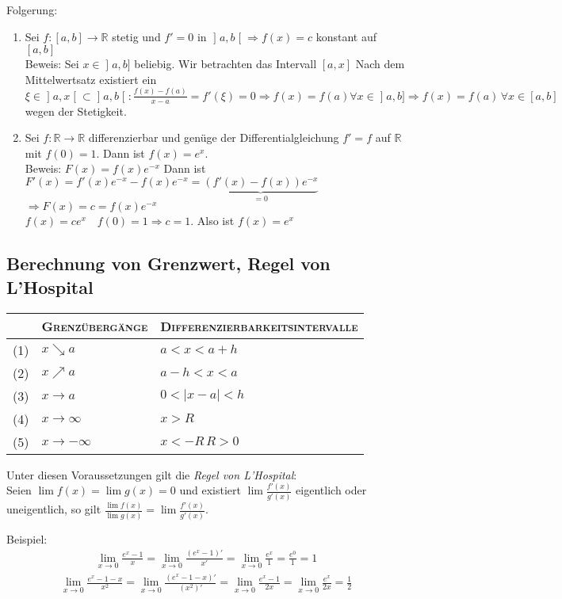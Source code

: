 \documentclass[ngerman,titlepage,twoside, parskip=half*]{scrreprt}
\newcommand*{\R}{\mathbb{R}}
\theoremstyle{plain}
\theoremstyle{definition}
\theoremstyle{remark}
\newcommand*{\abs}[2][]{#1\lvert#2#1\rvert}
\newcommand*{\lsofint}[1]{\mathopen{]}#1]}   %
\newcommand*{\bsofint}[1]{\mathopen{]}#1\mathclose{[}} %
\begin{document}
Folgerung:
\begin{enumerate}[(1)]
  \item Sei $f\colon[a,b]\rightarrow\R$ stetig und $f'=0$ in $\bsofint{a,b}
    \Rightarrow f(x)=c$ konstant auf $[a,b]$\\
    Beweis: Sei $x\in\lsofint{a,b}$ beliebig. Wir betrachten das Intervall $[a,x]$
    Nach dem Mittelwertsatz existiert ein $\xi\in\bsofint{a,x}\subset\bsofint{a,b}\colon
    \frac{f(x)-f(a)}{x-a}=f'(\xi)=0\Rightarrow f(x)=f(a) \forall x\in
    \lsofint{a,b}\Rightarrow f(x)=f(a)\,\forall x\in[a,b]$ wegen der Stetigkeit.
  \item Sei $f\colon\R\rightarrow\R$ differenzierbar und genüge der
    Differentialgleichung $f'=f$ auf $\R$ mit $f(0)=1$. Dann ist
    $f(x)=e^x$.\\
    Beweis: $F(x)=f(x)e^{-x}$ Dann ist $F'(x)=f'(x)e^{-x}-f(x)e^{-x}=
    \underbrace{(f'(x)-f(x))e^{-x}}_{=0}$\\
    $\Rightarrow F(x)=c=f(x)e^{-x}$\\
    $f(x)=ce^x\quad f(0)=1\Rightarrow c=1$. Also ist $f(x)=e^x$
\end{enumerate}

\subsection{Berechnung von Grenzwert, Regel von L'Hospital}
\begin{tabular}{c|l|l}
  & \textsc{Grenzübergänge} & \textsc{Differenzierbarkeitsintervalle}\\
  \hline
  (1) & $x\searrow a$ & $a<x<a+h$\\
  (2) & $x\nearrow a$ & $a-h<x<a$\\
  (3) & $x\rightarrow a$ & $0<\abs{x-a}<h$\\
  (4) & $x\rightarrow\infty$ & $ x>R$\\
  (5) & $x\rightarrow -\infty$ & $x<-R\,R>0$
\end{tabular}

Unter diesen Voraussetzungen gilt die \emph{Regel von L'Hospital}:\\
Seien $\lim f(x)=\lim g(x)=0$ und existiert $\lim \frac{f'(x)}{g'(x)}$
eigentlich oder uneigentlich, so gilt $\frac{\lim f(x)}{\lim g(x)}=\lim
\frac{f'(x)}{g'(x)}$.

Beispiel: \begin{gather*}\lim_{x\rightarrow 0} \frac{e^x-1}{x}=\lim_{x\rightarrow 0}
\frac{(e^x-1)'}{x'}
=\lim_{x\rightarrow 0} \frac{e^x}{1}=\frac{e^0}{1}=1\end{gather*}
\begin{gather*}\lim_{x\rightarrow 0} \frac{e^x-1-x}{x^2}=\lim_{x\rightarrow 0}
\frac{(e^x-1-x)'}{(x^2)'}=\lim_{x\rightarrow 0}\frac{e^x-1}{2x}=
\lim_{x\rightarrow 0}\frac{e^x}{2x}=\frac{1}{2}\end{gather*}
\end{document}
